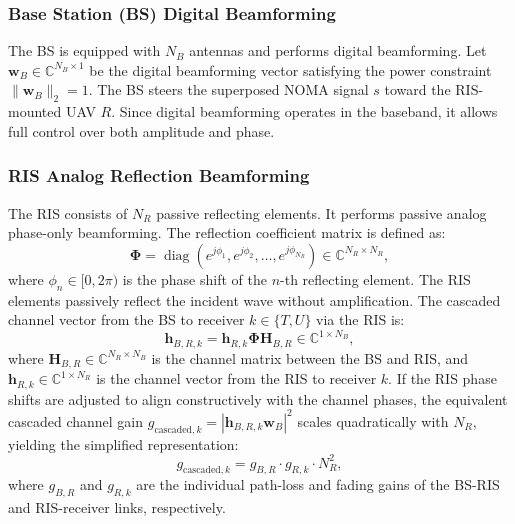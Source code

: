 \documentclass[journal,onecolumn]{IEEEtran}
\begin{document}
\subsubsection{Base Station (BS) Digital Beamforming}
The BS is equipped with $N_B$ antennas and performs digital beamforming. Let $\mathbf{w}_B \in \mathbb{C}^{N_B \times 1}$ be the digital beamforming vector satisfying the power constraint $\|\mathbf{w}_B\|_2 = 1$. The BS steers the superposed NOMA signal $s$ toward the RIS-mounted UAV $R$. Since digital beamforming operates in the baseband, it allows full control over both amplitude and phase.

\subsubsection{RIS Analog Reflection Beamforming}
The RIS consists of $N_R$ passive reflecting elements. It performs passive analog phase-only beamforming. The reflection coefficient matrix is defined as:
\begin{equation}
    \bm{\Phi} = \operatorname{diag}\left( e^{j\phi_1}, e^{j\phi_2}, \dots, e^{j\phi_{N_R}} \right) \in \mathbb{C}^{N_R \times N_R},
\end{equation}
where $\phi_n \in [0, 2\pi)$ is the phase shift of the $n$-th reflecting element. The RIS elements passively reflect the incident wave without amplification. The cascaded channel vector from the BS to receiver $k \in \{T, U\}$ via the RIS is:
\begin{equation}
    \mathbf{h}_{B,R,k} = \mathbf{h}_{R,k} \bm{\Phi} \mathbf{H}_{B,R} \in \mathbb{C}^{1 \times N_B},
\end{equation}
where $\mathbf{H}_{B,R} \in \mathbb{C}^{N_R \times N_B}$ is the channel matrix between the BS and RIS, and $\mathbf{h}_{R,k} \in \mathbb{C}^{1 \times N_R}$ is the channel vector from the RIS to receiver $k$. If the RIS phase shifts are adjusted to align constructively with the channel phases, the equivalent cascaded channel gain $g_{\text{cascaded}, k} = |\mathbf{h}_{B,R,k} \mathbf{w}_B|^2$ scales quadratically with $N_R$, yielding the simplified representation:
\begin{equation}
    g_{\text{cascaded}, k} = g_{B,R} \cdot g_{R,k} \cdot N_R^2,
\end{equation}
where $g_{B,R}$ and $g_{R,k}$ are the individual path-loss and fading gains of the BS-RIS and RIS-receiver links, respectively.
\end{document}
